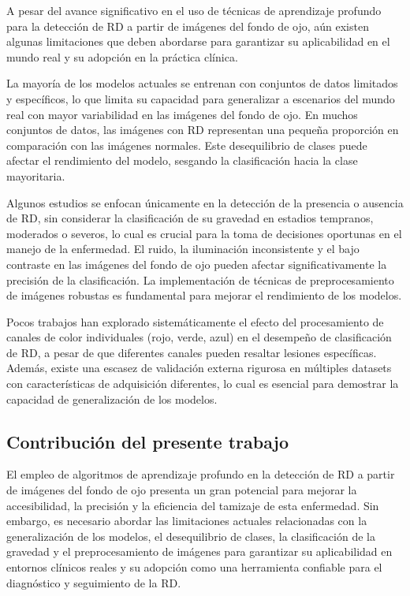A pesar del avance significativo en el uso de técnicas de aprendizaje profundo para la detección de RD a partir de imágenes del fondo de ojo, aún existen algunas limitaciones que deben abordarse para garantizar su aplicabilidad en el mundo real y su adopción en la práctica clínica.

La mayoría de los modelos actuales se entrenan con conjuntos de datos limitados y específicos, lo que limita su capacidad para generalizar a escenarios del mundo real con mayor variabilidad en las imágenes del fondo de ojo. En muchos conjuntos de datos, las imágenes con RD representan una pequeña proporción en comparación con las imágenes normales. Este desequilibrio de clases puede afectar el rendimiento del modelo, sesgando la clasificación hacia la clase mayoritaria.

Algunos estudios se enfocan únicamente en la detección de la presencia o ausencia de RD, sin considerar la clasificación de su gravedad en estadios tempranos, moderados o severos, lo cual es crucial para la toma de decisiones oportunas en el manejo de la enfermedad. El ruido, la iluminación inconsistente y el bajo contraste en las imágenes del fondo de ojo pueden afectar significativamente la precisión de la clasificación. La implementación de técnicas de preprocesamiento de imágenes robustas es fundamental para mejorar el rendimiento de los modelos.

Pocos trabajos han explorado sistemáticamente el efecto del procesamiento de canales de color individuales (rojo, verde, azul) en el desempeño de clasificación de RD, a pesar de que diferentes canales pueden resaltar lesiones específicas. Además, existe una escasez de validación externa rigurosa en múltiples datasets con características de adquisición diferentes, lo cual es esencial para demostrar la capacidad de generalización de los modelos.

\subsection{Contribución del presente trabajo}

El empleo de algoritmos de aprendizaje profundo en la detección de RD a partir de imágenes del fondo de ojo presenta un gran potencial para mejorar la accesibilidad, la precisión y la eficiencia del tamizaje de esta enfermedad. Sin embargo, es necesario abordar las limitaciones actuales relacionadas con la generalización de los modelos, el desequilibrio de clases, la clasificación de la gravedad y el preprocesamiento de imágenes para garantizar su aplicabilidad en entornos clínicos reales y su adopción como una herramienta confiable para el diagnóstico y seguimiento de la RD.

